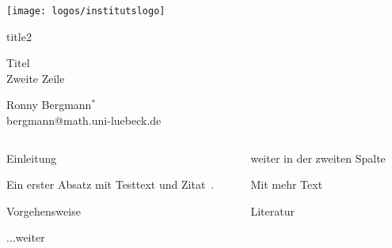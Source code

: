 \documentclass[german,12pt,xcolor=colortbl%
]{beamer}
\newcommand{\mySec}[1]{\vspace{1\baselineskip}\par{\Large\color{uzlmain}#1}\par\vspace{.5\baselineskip}}
\begin{document}
\begin{frame}[t]%
%
	\vspace{-1.1cm}
	\strut\par
	\texttt{[image: logos/institutslogo]} %
	\vspace{.9\baselineskip}
	\begin{beamercolorbox}[wd=\textwidth,sep=\baselineskip,leftskip=-.25em]{title2}
		\parbox[t]{.95\textwidth}{\Huge Titel\\Zweite Zeile}
			\vspace{\baselineskip}
			\par
			Ronny Bergmann\( ^{\ast} \)\\{\small bergmann@math.uni-luebeck.de}\vspace{-.5\baselineskip}
		\end{beamercolorbox}
%
%
 	\begin{columns}[t,totalwidth=\textwidth]
 		\begin{column}{.49\textwidth}
			\vspace{-.5\baselineskip}
 			\mySec{Einleitung}
			Ein erster Absatz mit Testtext und Zitat~\citep{TestEntry}.
			\mySec{Vorgehensweise}
			...weiter
 		\end{column}
		\begin{column}{.49\textwidth}
		\mySec{weiter in der zweiten Spalte}
		Mit mehr Text
		\vspace{50\baselineskip}
		\par{\color{uzlmain}Literatur}\par
 		{\small
			
 			
 		}
		\end{column}
	\end{columns}
\end{frame}
\end{document}

